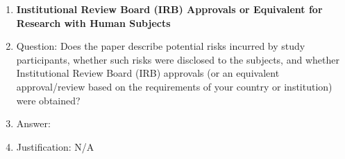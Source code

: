 \begin{enumerate}
\item {\bf Institutional Review Board (IRB) Approvals or Equivalent for Research with Human Subjects}
    \item[] Question: Does the paper describe potential risks incurred by study participants, whether such risks were disclosed to the subjects, and whether Institutional Review Board (IRB) approvals (or an equivalent approval/review based on the requirements of your country or institution) were obtained?
    \item[] Answer: \answerNA{} %
    \item[] Justification: N/A

\end{enumerate}